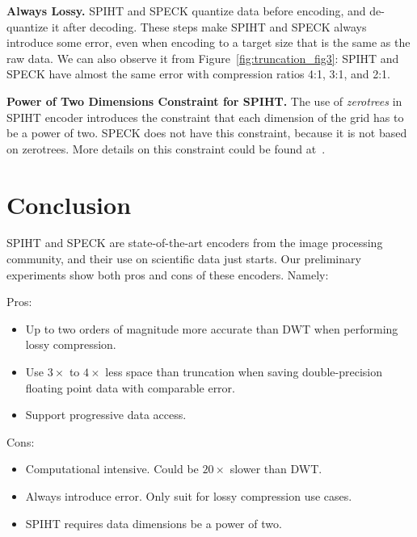 \documentclass[review]{vgtc}                 %
\newenvironment{tightItemize}{
\begin{itemize}
        \setlength{\itemsep}{1pt}
        \setlength{\parskip}{0pt}
        \setlength{\parsep}{0pt}
}{\end{itemize}
}
\begin{document}
\textbf{Always Lossy.}
%
SPIHT and SPECK quantize data before encoding,
and de-quantize it after decoding.
%
These steps make SPIHT and SPECK always introduce some error,
even when encoding to a target size that is the same as the raw data.
%
We can also observe it from Figure~\ref{fig:truncation_fig3}:
SPIHT and SPECK have almost the same error with compression ratios
4:1, 3:1, and 2:1.

\textbf{Power of Two Dimensions Constraint for SPIHT.}
%
The use of \textit{zerotrees} in SPIHT encoder introduces the constraint that
each dimension of the grid has to be a power of two.
%
SPECK does not have this constraint, because it is not based on zerotrees.
%
More details on this constraint could be found at~\cite{qcc1}.


\section{Conclusion}
%
SPIHT and SPECK are state-of-the-art encoders from the image processing
community, and their use on scientific data just starts.
%
Our preliminary experiments show both pros and cons of these encoders. 
Namely:

Pros:
\begin{tightItemize}
    \item Up to two orders of magnitude more accurate than DWT
          when performing lossy compression.
    \item Use $3\times$ to $4\times$ less space than truncation
          when saving double-precision floating point data with
          comparable error.
    \item Support progressive data access. 
\end{tightItemize}

Cons:
\begin{tightItemize}
    \item Computational intensive. Could be $20\times$ slower than DWT.
    \item Always introduce error. Only suit for lossy compression use cases.
    \item SPIHT requires data dimensions be a power of two.
\end{tightItemize}




\end{document}
